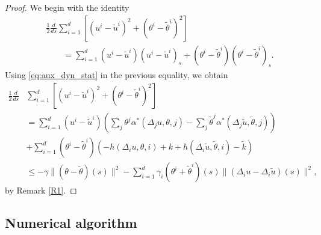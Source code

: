 \documentclass[12pt]{amsart}
\newcommand{\1}{{\chi}}
\newcommand{\lsb}{\left[}
\newcommand{\rsb}{\right]}
\newcommand{\lb}{\left(}
\newcommand{\rb}{\right)}
\theoremstyle{definition}
\begin{document}
        \begin{proof}
                We begin with the identity
                \begin{align*}
                &\frac{1}{2} \frac{d}{ds} \sum_{i=1}^d \lsb (u^i-\tilde u^i)^2  + (\theta^i- \tilde \theta^i)^2 \rsb \\&
                \qquad= \sum_{i=1}^d (u^i-\tilde u^i) (u^i-\tilde u^i)_s 
                      + (\theta^i-\tilde \theta^i) (\theta^i-\tilde \theta^i)_s.
            \end{align*}
            Using \eqref{eq:aux_dyn_stat} in the previous equality, we obtain
            \begin{align*}
                \frac{1}{2} \frac{d}{ds} &\sum_{i=1}^d \lsb (u^i-\tilde u^i)^2  + (\theta^i- \tilde \theta^i)^2 \rsb\\ 
                        &= \sum_{i=1}^d (u^i-\tilde u^i) \lb \sum_j \theta^j \alpha^*(\Delta_j u,\theta,j) - \sum_j \tilde \theta^j \alpha^*(\Delta_j \tilde u, \tilde \theta,j) \rb \\
                        &+ \sum_{i=1}^d  (\theta^i-\tilde \theta^i) \lb - h(\Delta_i u, \theta,i) + k +h(\Delta_i \tilde u, \tilde \theta,i) -\tilde k\rb\\
                        &\leq -\gamma \|(\theta- \tilde \theta)(s)\|^2 - \sum_{i=1}^d \gamma_i(\theta^i+\tilde \theta^i)(s) \|(\Delta_i u- \Delta_i \tilde u)(s)\| ^2,
            \end{align*}
            by Remark \ref{R1}.             
                \end{proof}             

                
                   
\subsection{Numerical algorithm}
\end{document}
